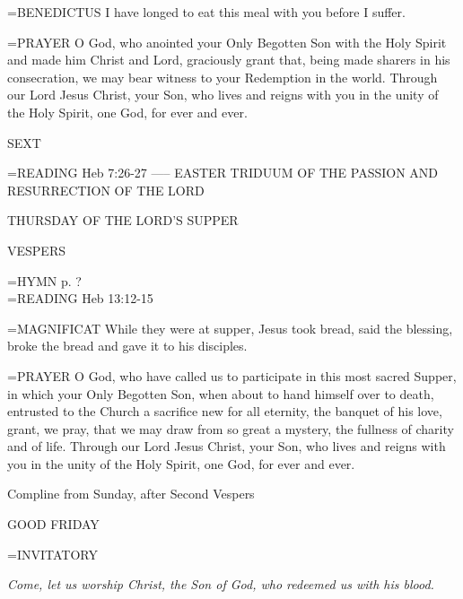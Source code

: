 \hangindent=\parindent \small{BENEDICTUS 	I have longed to eat this meal with you before I suffer.\\}

\hangindent=\parindent \small{PRAYER 	O God, who anointed your Only Begotten Son with the Holy Spirit and made him Christ and Lord, graciously grant that, being made sharers in his consecration, we may bear witness to your Redemption in the world. Through our Lord Jesus Christ, your Son, who lives and reigns with you in the unity of the Holy Spirit, one God, for ever and ever.}

\begin{flushleft}\normalsize SEXT\\\end{flushleft}
\hangindent=\parindent \small{READING}    Heb 7:26-27 \textbf{   }
-----
EASTER TRIDUUM
OF THE PASSION AND RESURRECTION
OF THE LORD

\begin{center}
\normalsize THURSDAY OF THE LORD'S SUPPER
\end{center}

\begin{flushleft}\normalsize VESPERS\\\end{flushleft}
\hangindent=\parindent \small{\uppercase{HYMN} p.  ?\\}
\hangindent=\parindent \small{READING}    Heb 13:12-15 \textbf{   \\}

\hangindent=\parindent \small{MAGNIFICAT 	While they were at supper, Jesus took bread, said the blessing, broke the bread and gave it to his disciples.\\}

\hangindent=\parindent \small{PRAYER 	O God, who have called us to participate in this most sacred Supper, in which your Only Begotten Son, when about to hand himself over to death, entrusted to the Church a sacrifice new for all eternity, the banquet of his love, grant, we pray, that we may draw from so great a mystery, the fullness of charity and of life. Through our Lord Jesus Christ, your Son, who lives and reigns with you in the unity of the Holy Spirit, one God, for ever and ever.}

Compline from Sunday, after Second Vespers

\begin{center}
\normalsize GOOD FRIDAY
\end{center}

\hangindent=\parindent \small{INVITATORY}
\begin{center}
\textit{Come, let us worship Christ, the Son of God, who redeemed us with his blood.\\}
\end{center}

